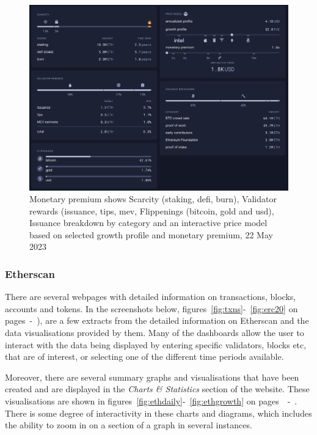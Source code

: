 \documentclass[UTF8]{article}
\begin{document}
\begin{figure}[htbp]
\begin{center}
\includegraphics[width=0.9\linewidth]{images/monetary}
\caption{Monetary premium shows Scarcity (staking, defi, burn), Validator rewards (issuance, tips, mev, Flippenings (bitcoin, gold and usd), Issuance breakdown by category and an interactive price model based on selected growth profile and monetary premium, 22 May 2023}
\label{fig:monetary}
\end{center}
\end{figure}

\clearpage
\subsubsection*{Etherscan}
There are several webpages with detailed information on transactions, blocks, accounts and tokens. In the screenshots below, figures~\ref{fig:txns}-~\ref{fig:erc20} on pages~\pageref{fig:txns}-~\pageref{fig:erc20}), are a few extracts from the detailed information on Etherscan and the data visualisations provided by them. Many of the dashboards allow the user to interact with the data being displayed by entering specific validators, blocks etc, that are of interest, or selecting one of the different time periods available. 

Moreover, there are several summary graphs and visualisations that have been created and are displayed in the \textit{Charts \& Statistics} section of the website. These visualisations are shown in figures~\ref{fig:ethdaily}-~\ref{fig:ethgrowth} on pages~\pageref{fig:ethdaily}~-~\pageref{fig:ethgrowth}. There is some degree of interactivity in these charts and diagrams, which includes the ability to zoom in on a section of a graph in several instances.\\
\end{document}
